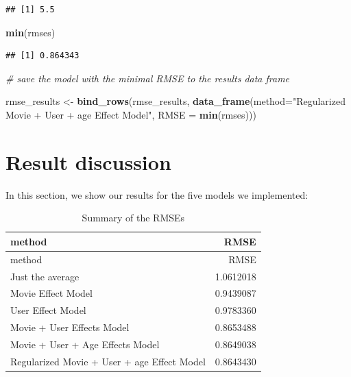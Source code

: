 \documentclass[]{article}
\newenvironment{Shaded}{\begin{snugshade}}{\end{snugshade}}
\newcommand{\KeywordTok}[1]{\textcolor[rgb]{0.13,0.29,0.53}{\textbf{#1}}}
\newcommand{\DataTypeTok}[1]{\textcolor[rgb]{0.13,0.29,0.53}{#1}}
\newcommand{\StringTok}[1]{\textcolor[rgb]{0.31,0.60,0.02}{#1}}
\newcommand{\CommentTok}[1]{\textcolor[rgb]{0.56,0.35,0.01}{\textit{#1}}}
\newcommand{\OperatorTok}[1]{\textcolor[rgb]{0.81,0.36,0.00}{\textbf{#1}}}
\newcommand{\NormalTok}[1]{#1}
\begin{document}
\begin{verbatim}
## [1] 5.5
\end{verbatim}

\begin{Shaded}
\begin{Highlighting}[]
\KeywordTok{min}\NormalTok{(rmses)}
\end{Highlighting}
\end{Shaded}

\begin{verbatim}
## [1] 0.864343
\end{verbatim}

\begin{Shaded}
\begin{Highlighting}[]
\CommentTok{# save the model with the minimal RMSE to the results data frame}

\NormalTok{rmse_results <-}\StringTok{ }\KeywordTok{bind_rows}\NormalTok{(rmse_results,}
                          \KeywordTok{data_frame}\NormalTok{(}\DataTypeTok{method=}\StringTok{"Regularized Movie + User + age Effect Model"}\NormalTok{,  }
                                     \DataTypeTok{RMSE =} \KeywordTok{min}\NormalTok{(rmses)))}
\end{Highlighting}
\end{Shaded}

\section{Result discussion}\label{result-discussion}

In this section, we show our results for the five models we implemented:

\begin{Shaded}
\end{Shaded}

\begin{longtable}[]{@{}lr@{}}
\caption{Summary of the RMSEs}\tabularnewline
\toprule
method & RMSE\tabularnewline
\midrule
\endfirsthead
\toprule
method & RMSE\tabularnewline
\midrule
\endhead
Just the average & 1.0612018\tabularnewline
Movie Effect Model & 0.9439087\tabularnewline
User Effect Model & 0.9783360\tabularnewline
Movie + User Effects Model & 0.8653488\tabularnewline
Movie + User + Age Effects Model & 0.8649038\tabularnewline
Regularized Movie + User + age Effect Model & 0.8643430\tabularnewline
\bottomrule
\end{longtable}
\end{document}
